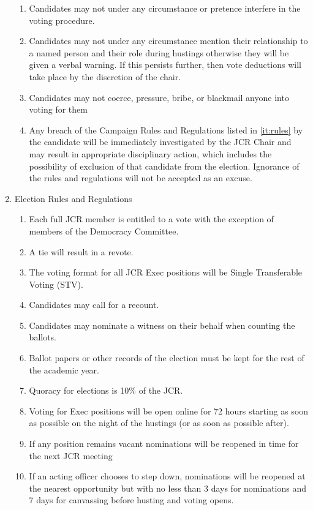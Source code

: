 \begin{enumerate}
\begin{enumerate}
        \item Candidates may not under any circumstance or pretence interfere in the voting procedure.
        \item Candidates may not under any circumstance mention their relationship to a named person and their role during hustings otherwise they will be given a verbal warning. If this persists further, then vote deductions will take place by the discretion of the chair.
        \item Candidates may not coerce, pressure, bribe, or blackmail anyone into voting for them 
        \item Any breach of the Campaign Rules and Regulations listed in \ref{it:rules} by the candidate will be immediately investigated by the JCR Chair and may result in appropriate disciplinary action, which includes the possibility of exclusion of that candidate from the election. Ignorance of the rules and regulations will not be accepted as an excuse.
    \end{enumerate}
    \item Election Rules and Regulations
    \begin{enumerate}
        \item Each full JCR member is entitled to a vote with the exception of members of the Democracy Committee.
        \item A tie will result in a revote.
        \item The voting format for all JCR Exec positions will be Single Transferable Voting (STV). 
        \item Candidates may call for a recount.
        \item Candidates may nominate a witness on their behalf when counting the ballots.
        \item Ballot papers or other records of the election must be kept for the rest of the academic year.
        \item Quoracy for elections is 10\% of the JCR.
        \item Voting for Exec positions will be open online for 72 hours starting as soon as possible on the night of the hustings (or as soon as possible after).
        \item If any position remains vacant nominations will be reopened in time for the next JCR meeting
        \item If an acting officer chooses to step down, nominations will be reopened at the nearest opportunity but with no less than 3 days for nominations and 7 days for canvassing before husting and voting opens.

\end{enumerate}
\end{enumerate}
